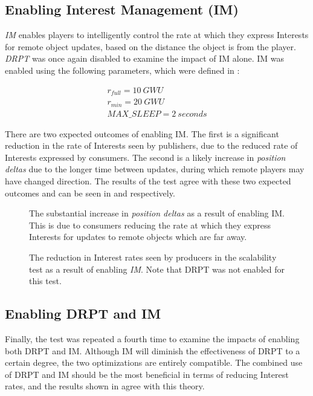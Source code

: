\subsection{Enabling Interest Management (IM)}
\textit{IM} enables players to intelligently control the rate at which they express Interests for remote object updates, based on the distance the object is from the player. \textit{DRPT} was once again disabled to examine the impact of IM alone. IM was enabled using the following parameters, which were defined in :

\begin{gather*}
    r_{full} = 10\ GWU\\
    r_{min} = 20\ GWU\\
    MAX\_SLEEP = 2\ seconds
\end{gather*}

There are two expected outcomes of enabling IM. The first is a significant reduction in the rate of Interests seen by publishers, due to the reduced rate of Interests expressed by consumers. The second is a likely increase in \textit{position deltas} due to the longer time between updates, during which remote players may have changed direction. The results of the test agree with these two expected outcomes and can be seen in  and  respectively.

\begin{figure}[H]
    \centering
    \caption{The substantial increase in \textit{position deltas} as a result of enabling IM. This is due to consumers reducing the rate at which they express Interests for updates to remote objects which are far away. }
    \label{fig:eval:im:pos-deltas}
\end{figure}


\begin{figure}[H]
    \centering
    \caption{The reduction in Interest rates seen by producers in the scalability test as a result of enabling \textit{IM}. Note that DRPT was not enabled for this test.}
    \label{fig:eval:im:interest-impacts}
\end{figure}

\subsection{Enabling DRPT and IM}
Finally, the test was repeated a fourth time to examine the impacts of enabling both DRPT and IM. Although IM will diminish the effectiveness of DRPT to a certain degree, the two optimizations are entirely compatible. The combined use of DRPT and IM should be the most beneficial in terms of reducing Interest rates, and the results shown in  agree with this theory. 

